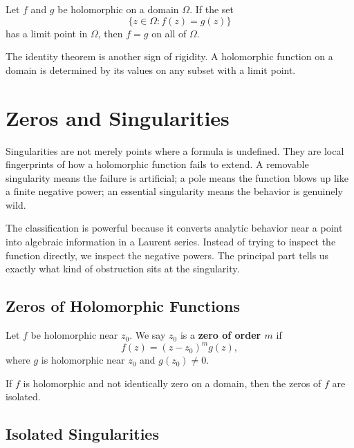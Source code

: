 \begin{theorem}
Let $f$ and $g$ be holomorphic on a domain $\Omega$. If the set
\[
    \{z\in\Omega:f(z)=g(z)\}
\]
has a limit point in $\Omega$, then $f=g$ on all of $\Omega$.
\end{theorem}

\begin{remark}
The identity theorem is another sign of rigidity. A holomorphic function on a domain is determined by its values on any subset with a limit point.
\end{remark}

\section{Zeros and Singularities}


Singularities are not merely points where a formula is undefined. They are local fingerprints of how a holomorphic function fails to extend. A removable singularity means the failure is artificial; a pole means the function blows up like a finite negative power; an essential singularity means the behavior is genuinely wild.

The classification is powerful because it converts analytic behavior near a point into algebraic information in a Laurent series. Instead of trying to inspect the function directly, we inspect the negative powers. The principal part tells us exactly what kind of obstruction sits at the singularity.

\subsection{Zeros of Holomorphic Functions}

\begin{definition}
Let $f$ be holomorphic near $z_0$. We say $z_0$ is a \textbf{zero of order $m$} if
\[
    f(z)=(z-z_0)^m g(z),
\]
where $g$ is holomorphic near $z_0$ and $g(z_0)\neq 0$.
\end{definition}

\begin{proposition}
If $f$ is holomorphic and not identically zero on a domain, then the zeros of $f$ are isolated.
\end{proposition}

\subsection{Isolated Singularities}

